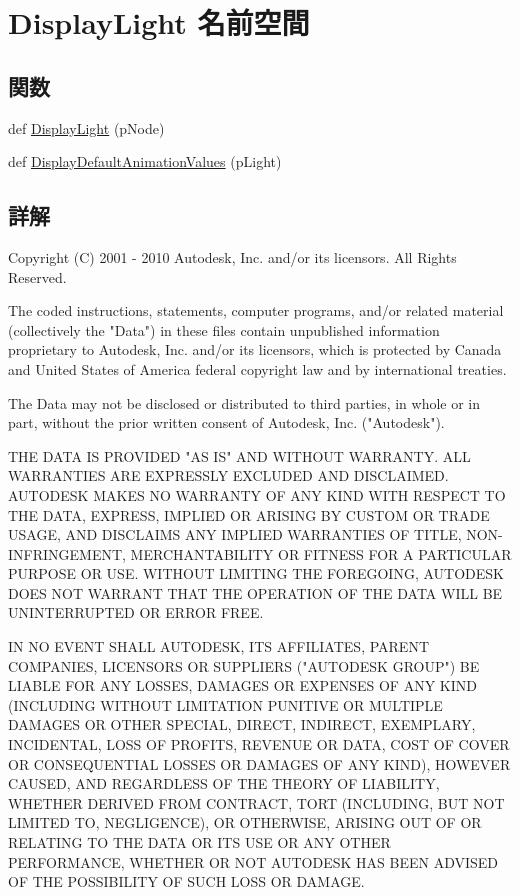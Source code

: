 \hypertarget{namespace_display_light}{}\section{Display\+Light 名前空間}
\label{namespace_display_light}
\subsection*{関数}
\begin{DoxyCompactItemize}
\item 
def \hyperlink{namespace_display_light_a4405713dc7552fc664d1b2d71e2ace07}{Display\+Light} (p\+Node)
\item 
def \hyperlink{namespace_display_light_a5caafa75376aa888f794310597d466e8}{Display\+Default\+Animation\+Values} (p\+Light)
\end{DoxyCompactItemize}


\subsection{詳解}
\begin{DoxyVerb} Copyright (C) 2001 - 2010 Autodesk, Inc. and/or its licensors.
 All Rights Reserved.

 The coded instructions, statements, computer programs, and/or related material 
 (collectively the "Data") in these files contain unpublished information 
 proprietary to Autodesk, Inc. and/or its licensors, which is protected by 
 Canada and United States of America federal copyright law and by international 
 treaties. 
 
 The Data may not be disclosed or distributed to third parties, in whole or in
 part, without the prior written consent of Autodesk, Inc. ("Autodesk").

 THE DATA IS PROVIDED "AS IS" AND WITHOUT WARRANTY.
 ALL WARRANTIES ARE EXPRESSLY EXCLUDED AND DISCLAIMED. AUTODESK MAKES NO
 WARRANTY OF ANY KIND WITH RESPECT TO THE DATA, EXPRESS, IMPLIED OR ARISING
 BY CUSTOM OR TRADE USAGE, AND DISCLAIMS ANY IMPLIED WARRANTIES OF TITLE, 
 NON-INFRINGEMENT, MERCHANTABILITY OR FITNESS FOR A PARTICULAR PURPOSE OR USE. 
 WITHOUT LIMITING THE FOREGOING, AUTODESK DOES NOT WARRANT THAT THE OPERATION
 OF THE DATA WILL BE UNINTERRUPTED OR ERROR FREE. 
 
 IN NO EVENT SHALL AUTODESK, ITS AFFILIATES, PARENT COMPANIES, LICENSORS
 OR SUPPLIERS ("AUTODESK GROUP") BE LIABLE FOR ANY LOSSES, DAMAGES OR EXPENSES
 OF ANY KIND (INCLUDING WITHOUT LIMITATION PUNITIVE OR MULTIPLE DAMAGES OR OTHER
 SPECIAL, DIRECT, INDIRECT, EXEMPLARY, INCIDENTAL, LOSS OF PROFITS, REVENUE
 OR DATA, COST OF COVER OR CONSEQUENTIAL LOSSES OR DAMAGES OF ANY KIND),
 HOWEVER CAUSED, AND REGARDLESS OF THE THEORY OF LIABILITY, WHETHER DERIVED
 FROM CONTRACT, TORT (INCLUDING, BUT NOT LIMITED TO, NEGLIGENCE), OR OTHERWISE,
 ARISING OUT OF OR RELATING TO THE DATA OR ITS USE OR ANY OTHER PERFORMANCE,
 WHETHER OR NOT AUTODESK HAS BEEN ADVISED OF THE POSSIBILITY OF SUCH LOSS
 OR DAMAGE. \end{DoxyVerb}
 

